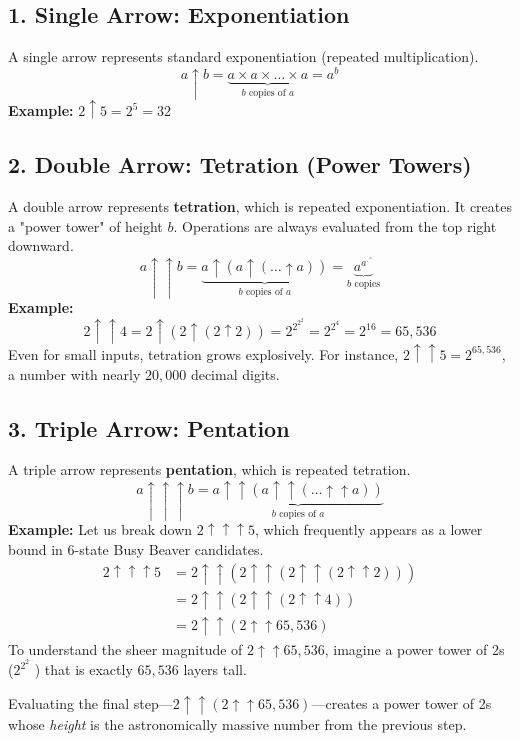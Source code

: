 \subsection*{1. Single Arrow: Exponentiation}
A single arrow represents standard exponentiation (repeated multiplication).
\[
    a \uparrow b = \underbrace{a \times a \times \dots \times a}_{b \text{ copies of } a} = a^b
\]
\textbf{Example:} \(2 \uparrow 5 = 2^5 = 32\)

\subsection*{2. Double Arrow: Tetration (Power Towers)}
A double arrow represents \textbf{tetration}, which is repeated exponentiation. It creates a "power tower" of height \(b\). Operations are always evaluated from the top right downward.
\[
    a \uparrow\uparrow b = \underbrace{a \uparrow (a \uparrow (\dots \uparrow a))}_{b \text{ copies of } a} = \underbrace{a^{a^{\cdot^{\cdot^{a}}}}}_{b \text{ copies}}
\]
\textbf{Example:} 
\[
    2 \uparrow\uparrow 4 = 2 \uparrow (2 \uparrow (2 \uparrow 2)) = 2^{2^{2^2}} = 2^{2^4} = 2^{16} = 65,536
\]
Even for small inputs, tetration grows explosively. For instance, \(2 \uparrow\uparrow 5 = 2^{65,536}\), a number with nearly \(20,000\) decimal digits.

\subsection*{3. Triple Arrow: Pentation}
A triple arrow represents \textbf{pentation}, which is repeated tetration. 
\[
    a \uparrow\uparrow\uparrow b = \underbrace{a \uparrow\uparrow (a \uparrow\uparrow (\dots \uparrow\uparrow a))}_{b \text{ copies of } a}
\]
\textbf{Example:} Let us break down \(2 \uparrow\uparrow\uparrow 5\), which frequently appears as a lower bound in \(6\)-state Busy Beaver candidates.
\begin{align*}
    2 \uparrow\uparrow\uparrow 5 &= 2 \uparrow\uparrow (2 \uparrow\uparrow (2 \uparrow\uparrow (2 \uparrow\uparrow 2))) \\
    &= 2 \uparrow\uparrow (2 \uparrow\uparrow (2 \uparrow\uparrow 4)) \\
    &= 2 \uparrow\uparrow (2 \uparrow\uparrow 65,536)
\end{align*}
To understand the sheer magnitude of \(2 \uparrow\uparrow 65,536\), imagine a power tower of 2s (\(2^{2^{2^{\dots}}}\)) that is exactly \(65,536\) layers tall. 

Evaluating the final step—\(2 \uparrow\uparrow (2 \uparrow\uparrow 65,536)\)—creates a power tower of 2s whose \textit{height} is the astronomically massive number from the previous step. 

